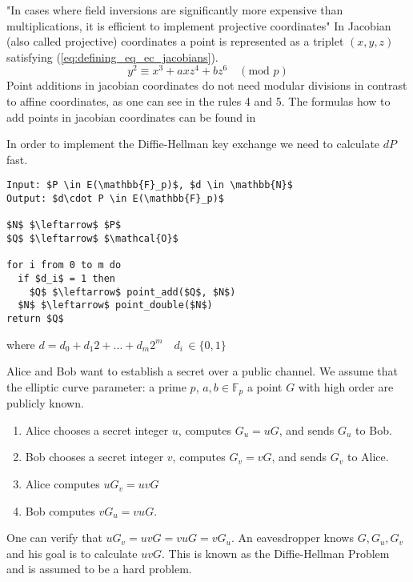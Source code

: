 "In cases where field inversions are significantly more expensive than multiplications, it is efficient to implement projective coordinates" \cite{Blake:1999} In Jacobian (also called projective) coordinates a point is represented as a triplet $(x,y,z)$ satisfying (\ref{eq:defining_eq_ec_jacobians}).
\begin{equation}\label{eq:defining_eq_ec_jacobians}
y^2 \equiv x^3 + axz^4 + bz^6 \quad (\text{mod } p)
\end{equation}
Point additions in jacobian coordinates do not need modular divisions in contrast to affine coordinates, as one can see in the rules 4 and 5. The formulas how to add points in jacobian coordinates can be found in \cite[p. 59-60]{Blake:1999}

In order to implement the Diffie-Hellman key exchange we need to calculate $dP$ fast.
\begin{lstlisting}[frame=single, mathescape=true, captionpos=b, caption=double-and-add method]
Input: $P \in E(\mathbb{F}_p)$, $d \in \mathbb{N}$
Output: $d\cdot P \in E(\mathbb{F}_p)$

$N$ $\leftarrow$ $P$
$Q$ $\leftarrow$ $\mathcal{O}$

for i from 0 to m do
  if $d_i$ = 1 then
    $Q$ $\leftarrow$ point_add($Q$, $N$)
  $N$ $\leftarrow$ point_double($N$)
return $Q$
\end{lstlisting}
where $d = d_0 + d_1 2 + ... + d_m 2^m \quad d_i \, \in \{0,1\}$

Alice and Bob want to establish a secret over a public channel. We assume that the elliptic curve parameter: a prime $p$, $a, b \in \mathbb{F}_p$ a point $G$ with high order are publicly known.
\begin{enumerate}
\item{Alice chooses a secret integer $u$, computes $G_u = uG$, and sends $G_u$ to Bob.}
\item{Bob chooses a secret integer $v$, computes $G_v = vG$, and sends $G_v$ to Alice.}
\item{Alice computes $uG_v = uvG$}
\item{Bob computes $vG_u = vuG$.}
\end{enumerate}
One can verify that $uG_v = uvG = vuG = v G_u$. An eavesdropper knows $G, G_u, G_v$ and his goal is to calculate $uvG$. This is known as the Diffie-Hellman Problem and is assumed to be a hard problem. 

